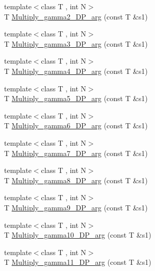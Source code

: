 \begin{DoxyCompactItemize}
\item 
{\footnotesize template$<$class T , int N$>$ }\\T \mbox{\hyperlink{namespaceENSEM_af33b985b43c584e03ac68fe4ff39078c}{Multiply\+\_\+gamma2\+\_\+\+D\+P\+\_\+arg}} (const T \&s1)
\item 
{\footnotesize template$<$class T , int N$>$ }\\T \mbox{\hyperlink{namespaceENSEM_adac24f5430c26eab09779f3718806256}{Multiply\+\_\+gamma3\+\_\+\+D\+P\+\_\+arg}} (const T \&s1)
\item 
{\footnotesize template$<$class T , int N$>$ }\\T \mbox{\hyperlink{namespaceENSEM_a0026955723cecd4a7e2efd8d4f2056b5}{Multiply\+\_\+gamma4\+\_\+\+D\+P\+\_\+arg}} (const T \&s1)
\item 
{\footnotesize template$<$class T , int N$>$ }\\T \mbox{\hyperlink{namespaceENSEM_a90a385ec1dc402e6976dbbd79cdb8cc7}{Multiply\+\_\+gamma5\+\_\+\+D\+P\+\_\+arg}} (const T \&s1)
\item 
{\footnotesize template$<$class T , int N$>$ }\\T \mbox{\hyperlink{namespaceENSEM_ac67ae153a00fc0bed76abd99e4673dd1}{Multiply\+\_\+gamma6\+\_\+\+D\+P\+\_\+arg}} (const T \&s1)
\item 
{\footnotesize template$<$class T , int N$>$ }\\T \mbox{\hyperlink{namespaceENSEM_ad660e49ac580eb428198d8e36340ec63}{Multiply\+\_\+gamma7\+\_\+\+D\+P\+\_\+arg}} (const T \&s1)
\item 
{\footnotesize template$<$class T , int N$>$ }\\T \mbox{\hyperlink{namespaceENSEM_a583fae06358258391aea7892702ac919}{Multiply\+\_\+gamma8\+\_\+\+D\+P\+\_\+arg}} (const T \&s1)
\item 
{\footnotesize template$<$class T , int N$>$ }\\T \mbox{\hyperlink{namespaceENSEM_a602908f02281a8e9841c857d21bf9e4b}{Multiply\+\_\+gamma9\+\_\+\+D\+P\+\_\+arg}} (const T \&s1)
\item 
{\footnotesize template$<$class T , int N$>$ }\\T \mbox{\hyperlink{namespaceENSEM_ad9734f79b04e6191b2edc36dd14e6da7}{Multiply\+\_\+gamma10\+\_\+\+D\+P\+\_\+arg}} (const T \&s1)
\item 
{\footnotesize template$<$class T , int N$>$ }\\T \mbox{\hyperlink{namespaceENSEM_a1d3654f9af27c70c78514a313cfc9d10}{Multiply\+\_\+gamma11\+\_\+\+D\+P\+\_\+arg}} (const T \&s1)

\end{DoxyCompactItemize}
